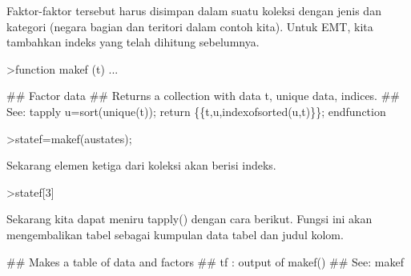 \documentclass[a4paper,10pt]{article}
\begin{document}
\begin{eulernotebook}
\begin{eulercomment}
\begin{eulercomment}
\begin{eulercomment}
\begin{eulercomment}
\begin{eulercomment}
\begin{eulercomment}
\begin{eulercomment}
\begin{eulercomment}
\begin{eulercomment}
\begin{eulercomment}
\begin{eulercomment}
\begin{eulercomment}
\begin{eulercomment}
\begin{eulercomment}
\begin{eulercomment}
\begin{eulercomment}
\begin{eulercomment}
\begin{eulercomment}
\begin{eulercomment}
\begin{eulercomment}
\begin{eulercomment}
\begin{eulercomment}
\begin{eulercomment}
\begin{eulercomment}
\begin{eulercomment}
\begin{eulercomment}
\begin{eulercomment}
\begin{eulercomment}
\begin{eulercomment}
\begin{eulercomment}
\begin{eulercomment}
\begin{eulercomment}
\begin{eulercomment}
\begin{eulercomment}
\begin{eulercomment}
Faktor-faktor tersebut harus disimpan dalam suatu koleksi dengan jenis
dan kategori (negara bagian dan teritori dalam contoh kita). Untuk
EMT, kita tambahkan indeks yang telah dihitung sebelumnya.
\end{eulercomment}
\begin{eulerprompt}
>function makef (t) ...
\end{eulerprompt}
\begin{eulerudf}
  ## Factor data
  ## Returns a collection with data t, unique data, indices.
  ## See: tapply
  u=sort(unique(t));
  return \{\{t,u,indexofsorted(u,t)\}\};
  endfunction
\end{eulerudf}
\begin{eulerprompt}
>statef=makef(austates);
\end{eulerprompt}
\begin{eulercomment}
Sekarang elemen ketiga dari koleksi akan berisi indeks.
\end{eulercomment}
\begin{eulerprompt}
>statef[3]
\end{eulerprompt}
\begin{euleroutput}
  [6,  5,  4,  2,  2,  3,  8,  8,  4,  7,  2,  7,  4,  4,  5,  6,  5,  3,
  8,  7,  4,  2,  2,  8,  5,  1,  2,  7,  7,  1]
\end{euleroutput}
\begin{eulercomment}
Sekarang kita dapat meniru tapply() dengan cara berikut. Fungsi ini
akan mengembalikan tabel sebagai kumpulan data tabel dan judul kolom.
\end{eulercomment}
\begin{eulerudf}
  ## Makes a table of data and factors
  ## tf : output of makef()
  ## See: makef

\end{eulerudf}
\end{eulercomment}
\end{eulercomment}
\end{eulercomment}
\end{eulercomment}
\end{eulercomment}
\end{eulercomment}
\end{eulercomment}
\end{eulercomment}
\end{eulercomment}
\end{eulercomment}
\end{eulercomment}
\end{eulercomment}
\end{eulercomment}
\end{eulercomment}
\end{eulercomment}
\end{eulercomment}
\end{eulercomment}
\end{eulercomment}
\end{eulercomment}
\end{eulercomment}
\end{eulercomment}
\end{eulercomment}
\end{eulercomment}
\end{eulercomment}
\end{eulercomment}
\end{eulercomment}
\end{eulercomment}
\end{eulercomment}
\end{eulercomment}
\end{eulercomment}
\end{eulercomment}
\end{eulercomment}
\end{eulercomment}
\end{eulercomment}
\end{eulernotebook}
\end{document}
